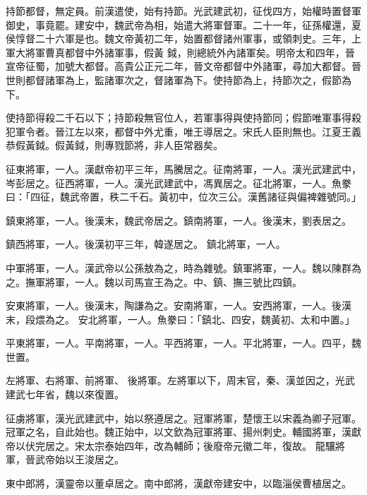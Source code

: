 \begin{pinyinscope}
 持節都督，無定員。前漢遣使，始有持節。光武建武初，征伐四方，始權時置督軍御史，事竟罷。建安中，魏武帝為相，始遣大將軍督軍。二十一年，征孫權還，夏侯惇督二十六軍是也。魏文帝黃初二年，始置都督諸州軍事，或領刺史。三年，上軍大將軍曹真都督中外諸軍事，假黃
 鉞，則總統外內諸軍矣。明帝太和四年，晉宣帝征蜀，加號大都督。高貴公正元二年，晉文帝都督中外諸軍，尋加大都督。晉世則都督諸軍為上，監諸軍次之，督諸軍為下。使持節為上，持節次之，假節為下。



 使持節得殺二千石以下；持節殺無官位人，若軍事得與使持節同；假節唯軍事得殺犯軍令者。晉江左以來，都督中外尤重，唯王導居之。宋氏人臣則無也。江夏王義恭假黃鉞。假黃鉞，則專戮節將，非人臣常器矣。



 征東將軍，一人。漢獻帝初平三年，馬騰居之。征南將軍，一人。漢光武建武中，岑彭居之。征西將軍，一人。漢光武建武中，馮異居之。征北將軍，一人。魚豢曰：「四征，魏武帝置，秩二千石。黃初中，位次三公。漢舊諸征與偏裨雜號同。」



 鎮東將軍，一人。後漢末，魏武帝居之。鎮南將軍，一人。後漢末，劉表居之。



 鎮西將軍，一人。後漢初平三年，韓遂居之。
 鎮北將軍，一人。



 中軍將軍，一人。漢武帝以公孫敖為之，時為雜號。鎮軍將軍，一人。魏以陳群為之。撫軍將軍，一人。魏以司馬宣王為之。中、鎮、撫三號比四鎮。



 安東將軍，一人。後漢末，陶謙為之。安南將軍，一人。安西將軍，一人。後漢末，段煨為之。
 安北將軍，一人。魚豢曰：「鎮北、四安，魏黃初、太和中置。」



 平東將軍，一人。平南將軍，一人。平西將軍，一人。平北將軍，一人。四平，魏世置。



 左將軍、右將軍、前將軍、
 後將軍。左將軍以下，周末官，秦、漢並因之，光武建武七年省，魏以來復置。



 征虜將軍，漢光武建武中，始以祭遵居之。冠軍將軍，楚懷王以宋義為卿子冠軍。冠軍之名，自此始也。魏正始中，以文欽為冠軍將軍、揚州刺史。輔國將軍，漢獻帝以伏完居之。宋太宗泰始四年，改為輔師；後廢帝元徽二年，復故。
 龍驤將軍，晉武帝始以王浚居之。



 東中郎將，漢靈帝以董卓居之。南中郎將，漢獻帝建安中，以臨淄侯曹植居之。




\end{pinyinscope}
